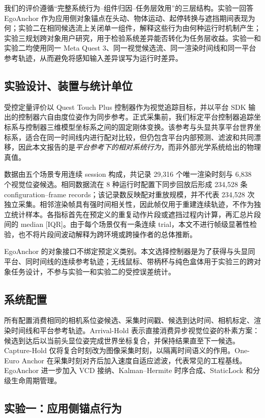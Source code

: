 \documentclass[review]{vgtc}
\begin{document}
我们的评价遵循“完整系统行为--组件归因--任务层效用”的三层结构。实验一回答 EgoAnchor 作为应用侧对象锚点在头动、物体运动、起停转换与遮挡期间表现为何；实验二在相同候选流上关闭单一组件，解释这些行为由何种运行时机制产生；实验三规划跨对象用户研究，用于检验系统差异能否转化为任务层收益。实验一和实验二均使用同一 Meta Quest 3、同一视觉候选流、同一渲染时间线和同一平台参考轨迹，从而避免将感知输入差异误写为运行时差异。

\subsection{实验设计、装置与统计单位}

受控定量评价以 Quest Touch Plus 控制器作为视觉追踪目标，并以平台 SDK 输出的控制器六自由度位姿作为同步参考。正式采集前，我们标定平台控制器追踪坐标系与控制器三维模型坐标系之间的固定刚体变换。该参考与头显共享平台世界坐标系，适合在同一时间线内进行配对比较，但仍包含平台内部预测、滤波和共同漂移，因此本文报告的是\emph{平台参考下的相对系统行为}，而非外部光学系统给出的物理真值。

数据由五个场景专用连续 session 构成，共记录 29,316 个唯一渲染时刻与 6,838 个视觉位姿候选。相同数据流在 8 种运行时配置下同步回放后形成 234,528 条 configuration--frame records；该记录数反映配对重放规模，并不代表 234,528 次独立采集。相邻渲染帧具有强时间相关性，因此帧仅用于重建连续轨迹，不作为独立统计样本。各指标首先在预定义的重复动作片段或遮挡过程内计算，再汇总片段间的 median [IQR]。由于每个场景仅有一条连续 trial，本文不进行帧级显著性检验，也不将片段间波动解释为跨环境或跨操作者的总体推断。

EgoAnchor 的对象接口不绑定预定义类别。本文选择控制器是为了获得与头显同平台、同时间线的连续参考轨迹；无线鼠标、带柄杯与纯色盒体用于实验三的跨对象任务设计，不参与实验一和实验二的受控误差统计。

\subsection{系统配置}

所有配置消费相同的相机系位姿候选、采集时间戳、候选到达时间、相机标定、渲染时间线和平台参考轨迹。Arrival-Hold 表示直接消费异步视觉位姿的朴素方案：候选到达后以当前头显位姿完成世界坐标复合，并保持结果直至下一候选。Capture-Hold 仅将复合时刻改为图像采集时刻，以隔离时间语义的作用。One-Euro Anchor 在采集时刻对齐后加入速度自适应滤波，代表常见的工程基线。EgoAnchor 进一步加入 VCD 接纳、Kalman--Hermite 时序合成、StaticLock 和分级生命周期管理。


\subsection{实验一：应用侧锚点行为}
\end{document}
